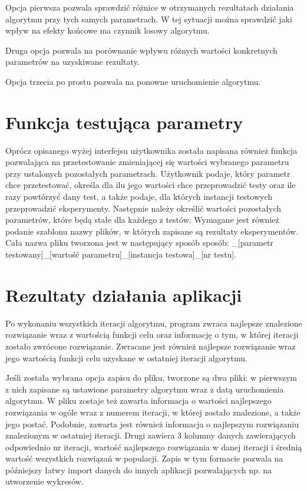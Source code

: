 Opcja pierwsza pozwala sprawdzić różnice w otrzymanych rezultatach działania algorytmu przy tych samych parametrach. W tej sytuacji można sprawdzić jaki wpływ na efekty końcowe ma czynnik losowy algorytmu.

Druga opcja pozwala na porównanie wpływu różnych wartości konkretnych parametrów na uzyskiwane rezultaty.

Opcja trzecia po prostu pozwala na ponowne uruchomienie algorytmu.

\section{Funkcja testująca parametry}
Oprócz opisanego wyżej interfejsu użytkownika została napisana również funkcja pozwalająca na przetestowanie zmieniającej się wartości wybranego parametru przy ustalonych pozostałych parametrach. Użytkownik podaje, który parametr chce przetestować, określa dla ilu jego wartości chce przeprowadzić testy oraz ile razy powtórzyć dany test, a także podaje, dla których instancji testowych przeprowadzić eksperymenty. Następnie należy określić wartości pozostałych parametrów, które będą stałe dla każdego z testów. Wymagane jest również podanie szablonu nazwy plików, w których zapisane są rezultaty eksperymentów. Cała nazwa pliku tworzona jest w następujący sposób sposób:
\newline
[szablon]\_[parametr testowany]\_[wartość parametru]\_[instancja testowa]\_[nr testu].

\section{Rezultaty działania aplikacji}
Po wykonaniu wszystkich iteracji algorytmu, program zwraca najlepsze znalezione rozwiązanie wraz z wartością funkcji celu oraz informację o tym, w której iteracji zostało zwrócone rozwiązanie. Zwracane jest również najlepsze rozwiązanie wraz jego wartością funkcji celu uzyskane w ostatniej iteracji algorytmu.

Jeśli została wybrana opcja zapisu do pliku, tworzone są dwa pliki: w pierwszym z nich zapisane są ustawione parametry algorytmu wraz z datą uruchomienia algorytmu. W pliku zostaje też zawarta informacja o wartości najlepszego rozwiązania w ogóle wraz z numerem iteracji, w której zostało znalezione, a także jego postać. Podobnie, zawarta jest również informacja o najlepszym rozwiązaniu znalezionym w ostatniej iteracji. Drugi zawiera 3 kolumny danych zawierających odpowiednio nr iteracji, wartość najlepszego rozwiązania w danej iteracji i średnią wartość wszystkich rozwiązań w populacji. Zapis w tym formacie pozwala na późniejszy łatwy import danych do innych aplikacji pozwalających np. na utworzenie wykresów.

